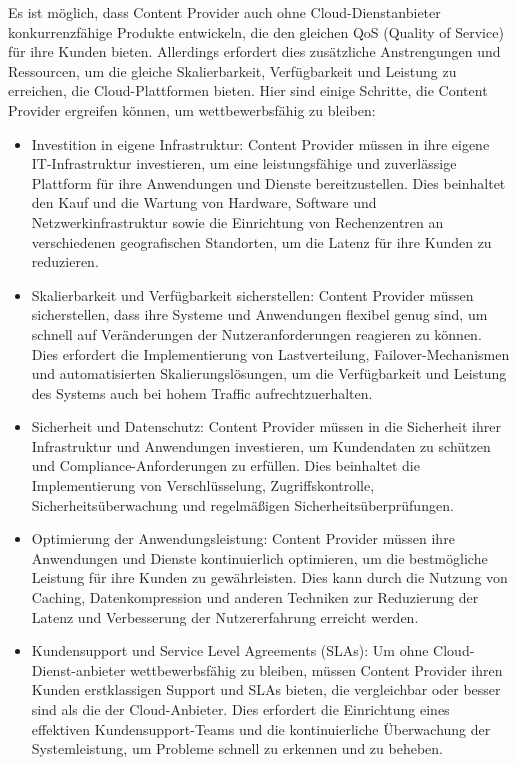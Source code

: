 Es ist möglich, dass Content Provider auch ohne Cloud-Dienstanbieter konkurrenzfähige Produkte entwickeln, die den gleichen QoS (Quality of Service) für ihre Kunden bieten. Allerdings erfordert dies zusätzliche Anstrengungen und Ressourcen, um die gleiche Skalierbarkeit, Verfügbarkeit und Leistung zu erreichen, die Cloud-Plattformen bieten. Hier sind einige Schritte, die Content Provider ergreifen können, um wettbewerbsfähig zu bleiben:
\begin{itemize}
\item Investition in eigene Infrastruktur: Content Provider müssen in ihre eigene IT-Infrastruktur investieren, um eine leistungsfähige und zuverlässige Plattform für ihre Anwendungen und Dienste bereitzustellen. Dies beinhaltet den Kauf und die Wartung von Hardware, Software und Netzwerkinfrastruktur sowie die Einrichtung von Rechenzentren an verschiedenen geografischen Standorten, um die Latenz für ihre Kunden zu reduzieren.
\item Skalierbarkeit und Verfügbarkeit sicherstellen: Content Provider müssen sicherstellen, dass ihre Systeme und Anwendungen flexibel genug sind, um schnell auf Veränderungen der Nutzeranforderungen reagieren zu können. Dies erfordert die Implementierung von Lastverteilung, Failover-Mechanismen und automatisierten Skalierungslösungen, um die Verfügbarkeit und Leistung des Systems auch bei hohem Traffic aufrechtzuerhalten.
\item Sicherheit und Datenschutz: Content Provider müssen in die Sicherheit ihrer Infrastruktur und Anwendungen investieren, um Kundendaten zu schützen und Compliance-Anforderungen zu erfüllen. Dies beinhaltet die Implementierung von Verschlüsselung, Zugriffskontrolle, Sicherheitsüberwachung und regelmäßigen Sicherheitsüberprüfungen.
\item Optimierung der Anwendungsleistung: Content Provider müssen ihre Anwendungen und Dienste kontinuierlich optimieren, um die bestmögliche Leistung für ihre Kunden zu gewährleisten. Dies kann durch die Nutzung von Caching, Datenkompression und anderen Techniken zur Reduzierung der Latenz und Verbesserung der Nutzererfahrung erreicht werden.
\item Kundensupport und Service Level Agreements (SLAs): Um ohne Cloud-Dienst-anbieter wettbewerbsfähig zu bleiben, müssen Content Provider ihren Kunden erstklassigen Support und SLAs bieten, die vergleichbar oder besser sind als die der Cloud-Anbieter. Dies erfordert die Einrichtung eines effektiven Kundensupport-Teams und die kontinuierliche Überwachung der Systemleistung, um Probleme schnell zu erkennen und zu beheben.
\end{itemize}
